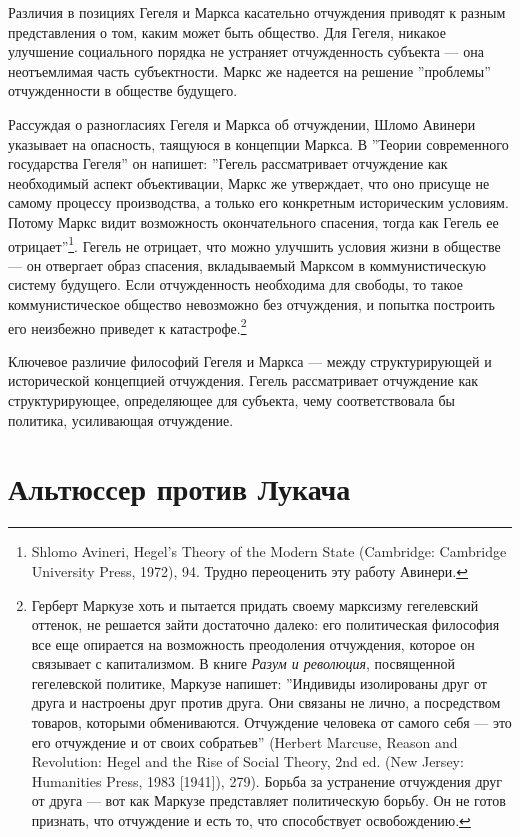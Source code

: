\documentclass[12pt]{book}
\begin{document}
Различия в позициях Гегеля и Маркса касательно отчуждения приводят к разным представления о том, каким может быть общество. Для Гегеля, никакое улучшение социального порядка не устраняет отчужденность субъекта --- она неотъемлимая часть субъектности. Маркс же надеется на решение ''проблемы'' отчужденности в обществе будущего.

Рассуждая о разногласиях Гегеля и Маркса об отчуждении, Шломо Авинери указывает на опасность, таящуюся в концепции Маркса. В ''Теории современного государства Гегеля'' он напишет: ''Гегель рассматривает отчуждение как необходимый аспект объективации, Маркс же утверждает, что оно присуще не самому процессу производства, а только его конкретным историческим условиям. Потому Маркс видит возможность окончательного спасения, тогда как Гегель ее отрицает''\footnote{Shlomo Avineri, Hegel’s Theory of the Modern State (Cambridge: Cambridge University Press, 1972), 94. Трудно переоценить эту работу Авинери.}. Гегель не отрицает, что можно улучшить условия жизни в обществе --- он отвергает образ спасения, вкладываемый Марксом в коммунистическую систему будущего. Если отчужденность необходима для свободы, то такое коммунистическое общество невозможно без отчуждения, и попытка построить его неизбежно приведет к катастрофе.\footnote{Герберт Маркузе хоть и пытается придать своему марксизму гегелевский оттенок, не решается зайти достаточно далеко: его политическая философия все еще опирается на возможность преодоления отчуждения, которое он связывает с капитализмом. В книге \textit{Разум и революция}, посвященной гегелевской политике, Маркузе напишет: ''Индивиды изолированы друг от друга и настроены друг против друга. Они связаны не лично, а посредством товаров, которыми обмениваются. Отчуждение человека от самого себя --- это его отчуждение и от своих собратьев'' (Herbert Marcuse, Reason and Revolution: Hegel and the Rise of Social Theory, 2nd ed. (New Jersey: Humanities Press, 1983 [1941]), 279). Борьба за устранение отчуждения друг от друга --- вот как Маркузе представляет политическую борьбу. Он не готов признать, что отчуждение и есть то, что способствует освобождению.}

Ключевое различие философий Гегеля и Маркса --- между структурирующей и исторической концепцией отчуждения. Гегель рассматривает отчуждение как структурирующее, определяющее для субъекта, чему соответствовала бы политика, усиливающая отчуждение.

\section{Альтюссер против Лукача}
\end{document}
